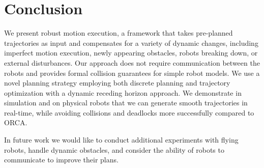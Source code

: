 \documentclass{svproc}
\newcommand{\todo}[1]{\textbf{\textcolor{red}{TODO: #1}}}
\begin{document}


\section{Conclusion}

We present robust motion execution, a framework that takes pre-planned trajectories as input and compensates for a variety of dynamic changes, including imperfect motion execution, newly appearing obstacles, robots breaking down, or external disturbances.
Our approach does not require communication between the robots and provides formal collision guarantees for simple robot models.
We use a novel planning strategy employing both discrete planning and trajectory optimization with a dynamic receding horizon approach.
We demonstrate in simulation and on physical robots that we can generate smooth trajectories in real-time, while avoiding collisions and deadlocks more successfully compared to ORCA.

In future work we would like to conduct additional experiments with flying robots, handle dynamic obstacles, and consider the ability of robots to communicate to improve their plans.


%
%





 
 
 

% 
\end{document}
